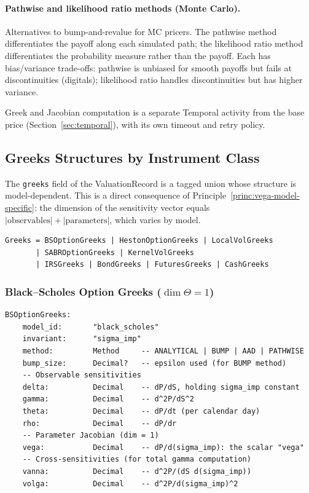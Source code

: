 \documentclass[11pt,a4paper]{article}
\begin{document}
\paragraph{Pathwise and likelihood ratio methods (Monte Carlo).}  Alternatives to bump-and-revalue for MC pricers.  The pathwise method differentiates the payoff along each simulated path; the likelihood ratio method differentiates the probability measure rather than the payoff.  Each has bias/variance trade-offs: pathwise is unbiased for smooth payoffs but fails at discontinuities (digitals); likelihood ratio handles discontinuities but has higher variance.

\noindent Greek and Jacobian computation is a separate Temporal activity from the base price (Section~\ref{sec:temporal}), with its own timeout and retry policy.

\subsection{Greeks Structures by Instrument Class}
\label{sec:greek-structures}

The \texttt{greeks} field of the ValuationRecord is a tagged union whose structure is model-dependent.  This is a direct consequence of Principle~\ref{princ:vega-model-specific}: the dimension of the sensitivity vector equals $|\text{observables}| + |\text{parameters}|$, which varies by model.

\begin{lstlisting}
Greeks = BSOptionGreeks | HestonOptionGreeks | LocalVolGreeks
       | SABROptionGreeks | KernelVolGreeks
       | IRSGreeks | BondGreeks | FuturesGreeks | CashGreeks
\end{lstlisting}

\subsubsection{Black--Scholes Option Greeks ($\dim\Theta = 1$)}
\begin{lstlisting}
BSOptionGreeks:
    model_id:       "black_scholes"
    invariant:      "sigma_imp"
    method:         Method     -- ANALYTICAL | BUMP | AAD | PATHWISE
    bump_size:      Decimal?   -- epsilon used (for BUMP method)
    -- Observable sensitivities
    delta:          Decimal    -- dP/dS, holding sigma_imp constant
    gamma:          Decimal    -- d^2P/dS^2
    theta:          Decimal    -- dP/dt (per calendar day)
    rho:            Decimal    -- dP/dr
    -- Parameter Jacobian (dim = 1)
    vega:           Decimal    -- dP/d(sigma_imp): the scalar "vega"
    -- Cross-sensitivities (for total gamma computation)
    vanna:          Decimal    -- d^2P/(dS d(sigma_imp))
    volga:          Decimal    -- d^2P/d(sigma_imp)^2
\end{lstlisting}
\end{document}
